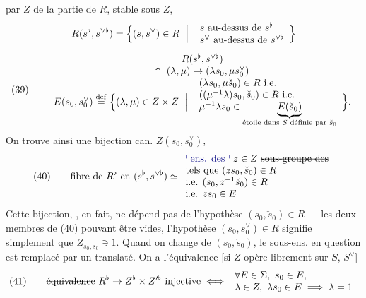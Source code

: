 \documentclass[11pt,a4paper]{article}
\begin{document}
par $Z$ de la partie de $R$, stable sous $Z$,  
\[
R(s^{\flat}, s^{\vee\flat}) = \Bigl\{(s, s^{\vee}) \in R \ \Bigm|\ 
\begin{array}{l}
s \text{ au-dessus de } s^{\flat} \\
s^{\vee} \text{ au-dessus de } s^{\vee\flat}
\end{array}
\Bigr\}
\]
\[
(39) \qquad
\begin{array}{c}
R(s^{\flat}, s^{\vee\flat}) \\
\uparrow \ (\lambda,\mu) \mapsto (\lambda s_0, \mu s_0^{\vee}) \\
E(s_0, s_0^{\vee}) \overset{\mathrm{def}}{=} \Bigl\{(\lambda,\mu) \in Z \times Z \ \Bigm|\ 
\begin{array}{l}
(\lambda s_0, \mu \check{s}_0) \in R \text{ i.e.} \\
((\mu^{-1}\lambda) s_0, \check{s}_0) \in R \text{ i.e.} \\
\mu^{-1}\lambda s_0 \in \underbrace{E(\check{s}_0)}_{\text{étoile dans $S$ définie par } \check{s}_0}
\end{array}
\Bigr\} .
\end{array}
\]
On trouve ainsi une bijection can. $Z(s_0, s_0^{\vee})$,
\[
(40) \qquad \text{fibre de } R^{\flat} \text{ en } (s^{\flat}, s^{\vee\flat}) \simeq
\begin{array}{l}
\text{\add{ens. des}} \ z \in Z \text{ \struck{sous-groupe des}} \\
\text{tels que } (z s_0, \check{s}_0) \in R \\
\text{i.e. } (s_0, z^{-1}\check{s}_0) \in R \\
\text{i.e. } z s_0 \in E
\end{array}
\]
Cette bijection, , en fait, ne dépend pas de l'hypothèse $(s_0, \check{s}_0) \in R$ --- les deux membres de (40) pouvant être vides, \struck{\ill{}} l'hypothèse $(s_0, s_0^{\vee}) \in R$ signifie simplement que $Z_{s_0, \check{s}_0} \ni 1$. Quand on change de $(s_0, \check{s}_0)$, le sous-ens. en question est remplacé par un translaté. 
On a l'équivalence [si $Z$ opère librement sur $S$, $S^{\vee}$]
\[
(41) \qquad
\text{\struck{équivalence}}\ R^{\flat} \to Z^{\flat} \times Z'^{\flat} \text{ injective}
\iff
\begin{array}{l}
\forall E \in \Sigma,\ s_0 \in E, \\
\lambda \in Z,\ \lambda s_0 \in E \implies \lambda = 1
\end{array}
\]
\end{document}
